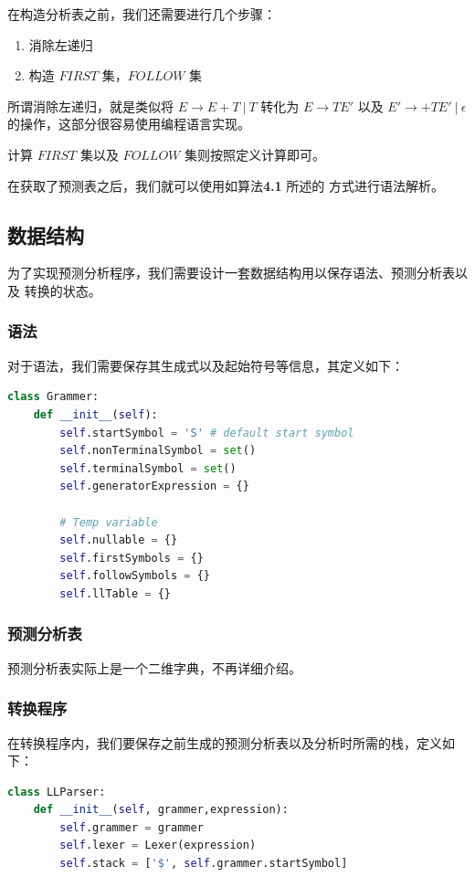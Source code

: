 \documentclass[blue,normal,cn]{elegantnote}
\begin{document}
在构造分析表之前，我们还需要进行几个步骤：
\begin{enumerate}
	\item 消除左递归
	\item 构造 $FIRST$ 集，$FOLLOW$ 集
\end{enumerate}

所谓消除左递归，就是类似将 $E \to E + T\ |\ T$ 转化为 $E \to TE'$ 以及
$E' \to + TE'\ |\ \epsilon$ 的操作，这部分很容易使用编程语言实现。

计算 $FIRST$ 集以及 $FOLLOW$ 集则按照定义计算即可。

在获取了预测表之后，我们就可以使用如算法\textbf{4.1} 所述的
方式进行语法解析。

\subsection{数据结构}
为了实现预测分析程序，我们需要设计一套数据结构用以保存语法、预测分析表以及
转换的状态。

\subsubsection{语法}

对于语法，我们需要保存其生成式以及起始符号等信息，其定义如下：

\begin{lstlisting}[language=python]
class Grammer:
    def __init__(self):
        self.startSymbol = 'S' # default start symbol
        self.nonTerminalSymbol = set()
        self.terminalSymbol = set()
        self.generatorExpression = {}

        # Temp variable
        self.nullable = {}
        self.firstSymbols = {}
        self.followSymbols = {}
        self.llTable = {}
\end{lstlisting}


\subsubsection{预测分析表}
预测分析表实际上是一个二维字典，不再详细介绍。

\subsubsection{转换程序}
在转换程序内，我们要保存之前生成的预测分析表以及分析时所需的栈，定义如下：

\begin{lstlisting}[language=python]
class LLParser:
    def __init__(self, grammer,expression):
        self.grammer = grammer
        self.lexer = Lexer(expression)
        self.stack = ['$', self.grammer.startSymbol]
\end{lstlisting}
\end{document}
